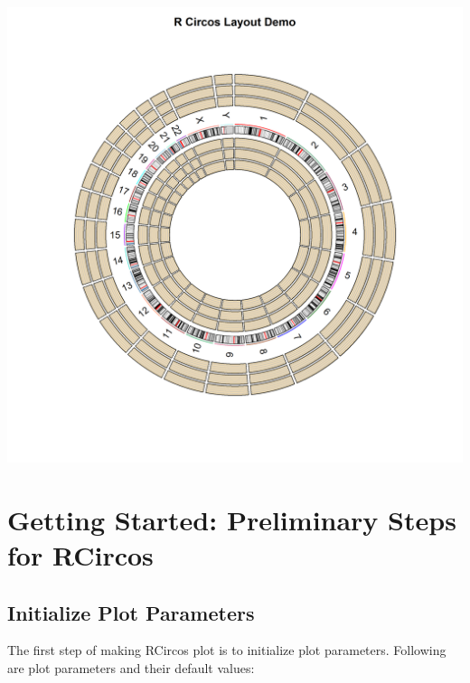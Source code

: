\documentclass{article}
\begin{document}
\includegraphics[width=1\textwidth]{RCircosLayoutDemo.png}


\section{Getting Started: Preliminary Steps for RCircos}

\subsection{Initialize Plot Parameters}

The first step of making RCircos plot is to initialize plot parameters. Following are plot parameters and their default values:
\end{document}
